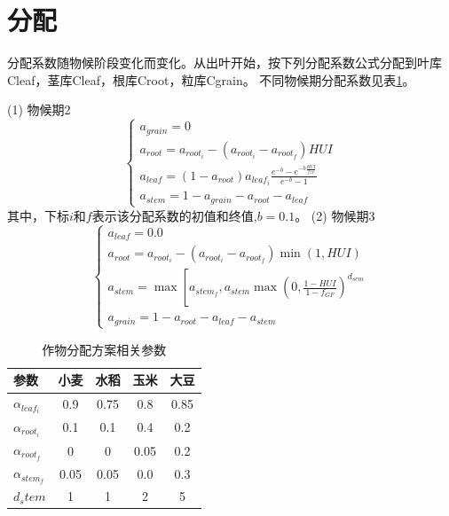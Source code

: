 \section{分配}
分配系数随物候阶段变化而变化。从出叶开始，按下列分配系数公式分配到叶库Cleaf，茎库Cleaf，根库Croot，粒库Cgrain。
不同物候期分配系数见表\ref{tab:作物分配方案相关参数}。

(1)	物候期2 \\
\begin{equation}
\left\{\begin{array}{c}
  a_{grain}=0 \\ 
  a_{root}=a_{root_i}-\left(a_{root_i}-a_{root_f}\right) HUI \\
  a_{leaf}=\left(1-a_{root}\right) a_{leaf_i} \frac{{e}^{-{b}}-{e}^{-b \frac{H U I}{f_{GF}}}}{{e}^{-{b}}-1}   \\
  a_{stem}=1-a_{ {grain }}-a_{ {root }}-a_{ {leaf }}\end{array}\right.
\end{equation}
其中，下标$i$和$f$表示该分配系数的初值和终值,$b=0.1$。
(2)	物候期3 \\
\begin{equation}
  \left\{\begin{array}{c}
    a_{leaf}=0.0 \\ 
    a_{root}=a_{root_i}-\left(a_{root_i}-a_{root_f}\right) \min(1, HUI) \\
    a_{stem}=\max \left[a_{stem_f}, a_{stem} \max \left(0, \frac{1-HUI}{1-f_{GF}}\right)^{d_{sem}}\right. \\
    a_{grain}=1-a_{root}-a_{leaf}-a_{stem}\end{array}\right.
\end{equation}
\begin{table}[]
  \centering
  \caption{作物分配方案相关参数}
  \label{tab:作物分配方案相关参数}
\begin{tabular}{@{}lcccc@{}}
  \toprule
参数       & 小麦   & 水稻   & 玉米   & 大豆   \\ \midrule
$\alpha_{leaf_i}$ & 0.9  & 0.75 & 0.8  & 0.85 \\
$\alpha_{root_i}$ & 0.1  & 0.1  & 0.4  & 0.2  \\
$\alpha_{root_f}$ & 0    & 0    & 0.05 & 0.2  \\
$\alpha_{stem_f}$ & 0.05 & 0.05 & 0.0  & 0.3  \\
$d_stem$    & 1    & 1    & 2    & 5   \\\bottomrule
\end{tabular}
\end{table}
